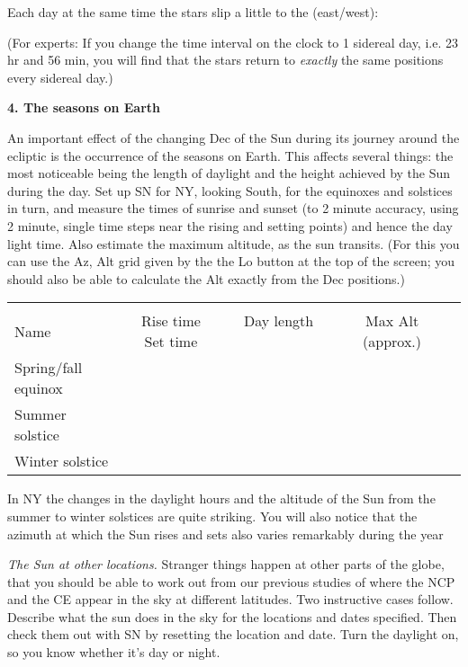 \documentclass[12pt]{article}
\begin{document}
\medskip  
Each day at the same time the stars slip a little to the (east/west):
\makebox[2cm]{\hrulefill}

\bigskip
(For experts: If you change the time interval on the clock to 1
sidereal day, i.e. 23 hr and 56 min, you will find that the stars
return to \emph{exactly} the same positions every sidereal day.)


\medskip 
\bigskip

\newpage
\noindent
{\bf 4. The seasons on Earth}

\medskip
\noindent
An important effect of the changing Dec of the Sun during its journey
around the ecliptic is the occurrence of the seasons on Earth. This
affects several things: the most noticeable being the length of
daylight and the height achieved by the Sun during the day.  Set up SN
for NY, looking South, for the equinoxes and solstices in turn, and
measure the times of sunrise and sunset (to 2 minute accuracy, using
2 minute, single time steps near the rising and setting points)
and hence the day light time. Also estimate the maximum altitude, as
the sun transits. (For this you can use the Az, Alt grid given by the the
Lo button at the top of the screen; you should also be able to
calculate the Alt exactly from the Dec positions.)

\begin{center}
\begin{tabular}{lcccc} \hline \\ [-6pt]
Name & \hspace{0.5cm} Rise time \hspace{0.7cm} Set time \hspace{1cm}
 & Day length \ \ \ \ \ \ \ \ &
Max Alt (approx.)  \hspace{1cm}\\ [6pt]
\hline
Spring/fall equinox &   &  & &     \\ \hline
Summer solstice & & & &  \\ \hline
Winter solstice  & & & &  \\ \hline
\end{tabular}
\end{center}

In NY the changes in the daylight hours and the altitude of the Sun 
from the summer to winter solstices are quite striking. You will also
notice that the azimuth at which the Sun rises and sets also varies
remarkably during the year



\bigskip
\noindent
\emph{The Sun at other locations.} Stranger things happen at other
parts of the globe, that you should be able to work out from our
previous studies of where the NCP and the CE appear in the sky at
different latitudes.  Two instructive cases follow.  Describe what the
sun does in the sky for the locations and dates specified.  Then check
them out with SN by resetting the location and date. Turn the daylight
on, so you know whether it's day or night.
\end{document}
